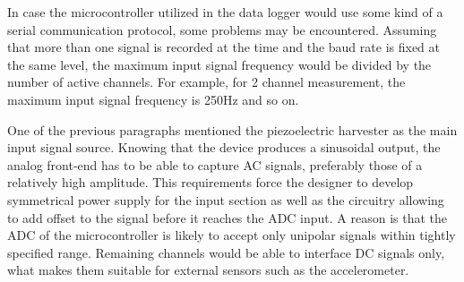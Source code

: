 \documentclass[12pt,a4paper]{article}
\begin{document}
In case the microcontroller utilized in the data logger would use some kind of a serial communication protocol, some problems may be encountered. Assuming that more than one signal is recorded at the time and the baud rate is fixed at the same level, the maximum input signal frequency would be divided by the number of active channels. For example, for 2 channel measurement, the maximum input signal frequency is 250Hz and so on.
\par

One of the previous paragraphs mentioned the piezoelectric harvester as the main input signal source. Knowing that the device produces a sinusoidal output, the analog front-end has to be able to capture AC signals, preferably those of a relatively high amplitude. This requirements force the designer to develop symmetrical power supply for the input section as well as the circuitry allowing to add offset to the signal before it reaches the ADC input. A reason is that the ADC of the microcontroller is likely to accept only unipolar signals within tightly specified range. Remaining channels would be able to interface DC signals only, what makes them suitable for external sensors such as the accelerometer.
\par
\end{document}
